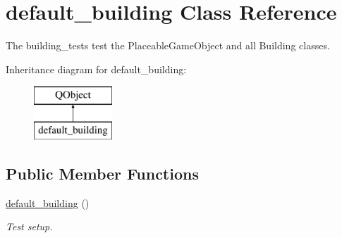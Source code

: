 \hypertarget{classdefault__building}{\section{default\-\_\-building Class Reference}
\label{classdefault__building}
}


The building\-\_\-tests test the Placeable\-Game\-Object and all Building classes.  


Inheritance diagram for default\-\_\-building\-:\begin{figure}[H]
\begin{center}
\leavevmode
\includegraphics[height=2.000000cm]{classdefault__building}
\end{center}
\end{figure}
\subsection*{Public Member Functions}
\begin{DoxyCompactItemize}
\item 
\hyperlink{classdefault__building_aa00a39e3aec1b2ea8cda18401df560c4}{default\-\_\-building} ()
\begin{DoxyCompactList}\small\item\em Test setup. \end{DoxyCompactList}\end{DoxyCompactItemize}
